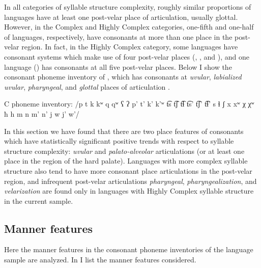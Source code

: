   In all categories of syllable structure complexity, roughly similar proportions of languages have at least one post-velar place of articulation, usually glottal. However, in the Complex and Highly Complex categories, one-fifth and one-half of languages, respectively, have consonants at more than one place in the post-velar region. In fact, in the Highly Complex category, some languages have consonant systems which make use of four post-velar places (, , and ), and one language () has consonants at all five post-velar places. Below I show the consonant phoneme inventory of , which has consonants at \textit{uvular}, \textit{labialized uvular}, \textit{pharyngeal}, and \textit{glottal} places of articulation .

\ea\label{ex:4.33}
\begin{Coding}
\item[C phoneme inventory:] /p t k kʷ q qʷ ʕ ʔ p’ t’ k’ k’ʷ t͡s t͡ʃ t͡ɬ t͡s’ t͡ʃ’ t͡ɬ’ s ɬ ʃ x xʷ χ χʷ ħ h m n m’ n’ j w j’ w’/
\end{Coding}
\z

  In this section we have found that there are two place features of consonants which have statistically significant positive trends with respect to syllable structure complexity: \textit{uvular} and \textit{palato-alveolar} articulations (or at least one place in the region of the hard palate). Languages with more complex syllable structure also tend to have more consonant place articulations in the post-velar region, and infrequent post-velar articulations \textit{pharyngeal}, \textit{pharyngealization}, and \textit{velarization} are found only in languages with Highly Complex syllable structure in the current sample.

\subsection{Manner features}\label{sec:4.4.5}

  Here the manner features in the consonant phoneme inventories of the language sample are analyzed. In  I list the manner features considered.

